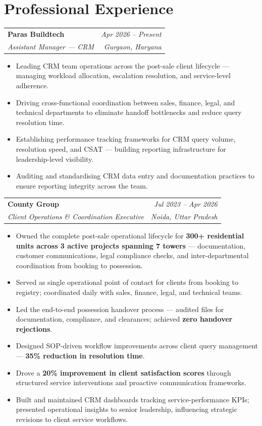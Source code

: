 \documentclass[a4paper,11pt]{article}
\makeatletter
\newcommand{\experience}[4]{%
  \begin{tabularx}{\linewidth}{@{}X r@{}}
    \textbf{#1} & \textit{\color{muted}#3} \\
    \textit{#2} & \textit{\color{muted}#4} \\
  \end{tabularx}\vspace{3pt}%
}
\makeatother
\begin{document}
\section*{Professional Experience}

\experience{Paras Buildtech}{Assistant Manager --- CRM}{Apr 2026 -- Present}{Gurgaon, Haryana}
\begin{itemize}
  \item Leading CRM team operations across the post-sale client lifecycle --- managing workload allocation, escalation resolution, and service-level adherence.
  \item Driving cross-functional coordination between sales, finance, legal, and technical departments to eliminate handoff bottlenecks and reduce query resolution time.
  \item Establishing performance tracking frameworks for CRM query volume, resolution speed, and CSAT --- building reporting infrastructure for leadership-level visibility.
  \item Auditing and standardising CRM data entry and documentation practices to ensure reporting integrity across the team.
\end{itemize}

\vspace{8pt}

\experience{County Group}{Client Operations \& Coordination Executive}{Jul 2023 -- Apr 2026}{Noida, Uttar Pradesh}
\begin{itemize}
  \item Owned the complete post-sale operational lifecycle for \textbf{300+ residential units across 3 active projects spanning 7 towers} --- documentation, customer communications, legal compliance checks, and inter-departmental coordination from booking to possession.
  \item Served as single operational point of contact for clients from booking to registry; coordinated daily with sales, finance, legal, and technical teams.
  \item Led the end-to-end possession handover process --- audited files for documentation, compliance, and clearances; achieved \textbf{zero handover rejections}.
  \item Designed SOP-driven workflow improvements across client query management --- \textbf{35\% reduction in resolution time}.
  \item Drove a \textbf{20\% improvement in client satisfaction scores} through structured service interventions and proactive communication frameworks.
  \item Built and maintained CRM dashboards tracking service-performance KPIs; presented operational insights to senior leadership, influencing strategic revisions to client service workflows.
\end{itemize}
\end{document}
